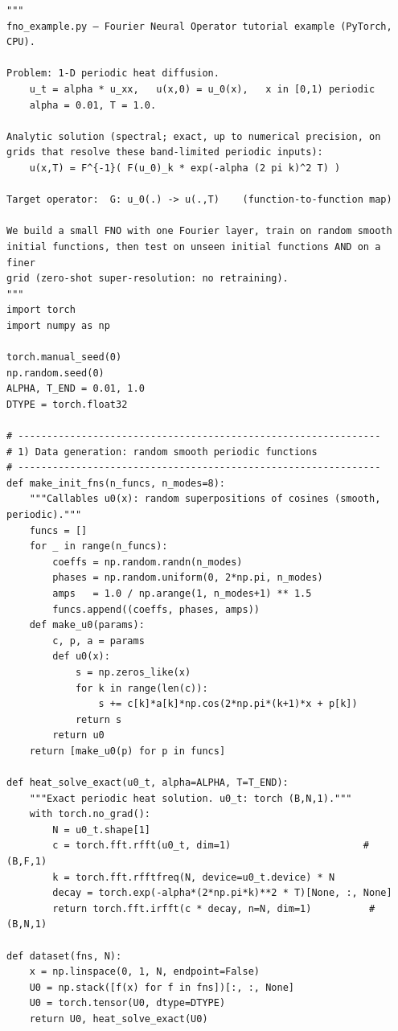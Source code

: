 \begin{lstlisting}[style=appbpystyle, firstnumber=1, caption={\texttt{FNO Worked Example (PyTorch).py}, lines 1--59: module docstring, seeds, the input family \eqref{eq:appb-input}, the exact periodic heat solution \eqref{eq:appb-multiplier}, and the grid sampler. Printed verbatim.}, label={lst:appb-data}]
"""
fno_example.py — Fourier Neural Operator tutorial example (PyTorch, CPU).

Problem: 1-D periodic heat diffusion.
    u_t = alpha * u_xx,   u(x,0) = u_0(x),   x in [0,1) periodic
    alpha = 0.01, T = 1.0.

Analytic solution (spectral; exact, up to numerical precision, on grids that resolve these band-limited periodic inputs):
    u(x,T) = F^{-1}( F(u_0)_k * exp(-alpha (2 pi k)^2 T) )

Target operator:  G: u_0(.) -> u(.,T)    (function-to-function map)

We build a small FNO with one Fourier layer, train on random smooth
initial functions, then test on unseen initial functions AND on a finer
grid (zero-shot super-resolution: no retraining).
"""
import torch
import numpy as np

torch.manual_seed(0)
np.random.seed(0)
ALPHA, T_END = 0.01, 1.0
DTYPE = torch.float32

# ---------------------------------------------------------------
# 1) Data generation: random smooth periodic functions
# ---------------------------------------------------------------
def make_init_fns(n_funcs, n_modes=8):
    """Callables u0(x): random superpositions of cosines (smooth, periodic)."""
    funcs = []
    for _ in range(n_funcs):
        coeffs = np.random.randn(n_modes)
        phases = np.random.uniform(0, 2*np.pi, n_modes)
        amps   = 1.0 / np.arange(1, n_modes+1) ** 1.5
        funcs.append((coeffs, phases, amps))
    def make_u0(params):
        c, p, a = params
        def u0(x):
            s = np.zeros_like(x)
            for k in range(len(c)):
                s += c[k]*a[k]*np.cos(2*np.pi*(k+1)*x + p[k])
            return s
        return u0
    return [make_u0(p) for p in funcs]

def heat_solve_exact(u0_t, alpha=ALPHA, T=T_END):
    """Exact periodic heat solution. u0_t: torch (B,N,1)."""
    with torch.no_grad():
        N = u0_t.shape[1]
        c = torch.fft.rfft(u0_t, dim=1)                       # (B,F,1)
        k = torch.fft.rfftfreq(N, device=u0_t.device) * N
        decay = torch.exp(-alpha*(2*np.pi*k)**2 * T)[None, :, None]
        return torch.fft.irfft(c * decay, n=N, dim=1)          # (B,N,1)

def dataset(fns, N):
    x = np.linspace(0, 1, N, endpoint=False)
    U0 = np.stack([f(x) for f in fns])[:, :, None]
    U0 = torch.tensor(U0, dtype=DTYPE)
    return U0, heat_solve_exact(U0)
\end{lstlisting}

